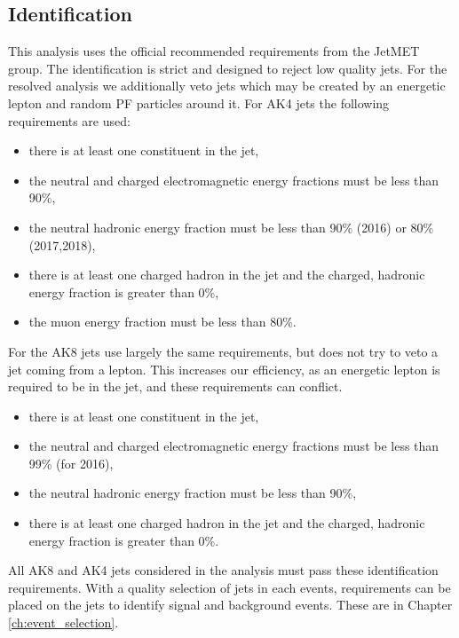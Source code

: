 \subsection{Identification}
This analysis uses the official recommended requirements from the \CMS JetMET group. The identification is strict and designed to reject low quality jets.  For the resolved analysis we additionally veto jets which may be created by an energetic lepton and random PF particles around it.
For AK4 jets the following requirements are used:
\begin{description}
  \begin{itemize}
      \item there is at least one constituent in the jet,
      \item the neutral and charged electromagnetic energy fractions must be less than 90\%,
      \item the neutral hadronic energy fraction must be less than 90\% (2016) or 80\% (2017,2018),
      \item there is at least one charged hadron in the jet and the charged, hadronic energy fraction is greater than 0\%,
      \item the muon energy fraction must be less than 80\%.
  \end{itemize}
\end{description}
For the AK8 jets use largely the same requirements, but does not try to veto a jet coming from a lepton. This increases our efficiency, as an energetic lepton is required to be in the jet, and these requirements can conflict.
\begin{description}
  \begin{itemize}
      \item there is at least one constituent in the jet,
      \item the neutral and charged electromagnetic energy fractions must be less than 99\% (for 2016),
      \item the neutral hadronic energy fraction must be less than 90\%,
      \item there is at least one charged hadron in the jet and the charged, hadronic energy fraction is greater than 0\%.
  \end{itemize}
\end{description}

All AK8 and AK4 jets considered in the analysis must pass these identification requirements. With a quality selection of jets in each events, requirements can be placed on the jets to identify signal and background events.  These are in Chapter \ref{ch:event_selection}.

